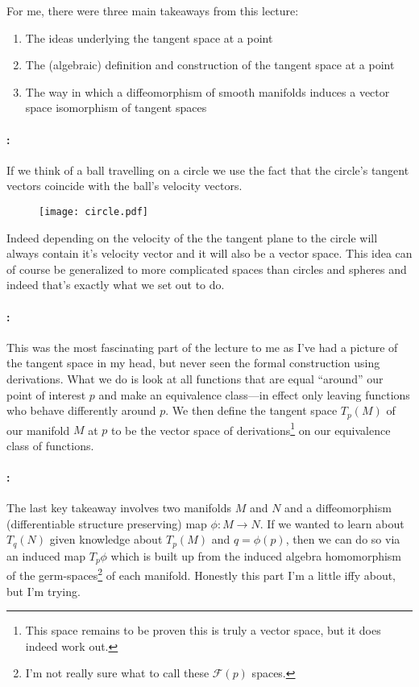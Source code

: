 \documentclass{homework}
\begin{document}
For me, there were three main takeaways from this lecture:
\begin{enumerate}
	\item The ideas underlying the tangent space at a point \label{it:idea}
	\item The (algebraic) definition and construction of the tangent space at a point \label{it:alg}
	\item The way in which a diffeomorphism of smooth manifolds induces a vector space isomorphism of tangent spaces \label{it:diff}
\end{enumerate}

\paragraph{:}
If we think of a ball travelling on a circle we use the fact that the circle's tangent vectors coincide with the ball's velocity vectors.
\begin{figure}[h]
	\centering
	\texttt{[image: circle.pdf]}
\end{figure}
Indeed depending on the velocity of the the tangent plane to the circle will always contain it's velocity vector and it will also be a vector space.
This idea can of course be generalized to more complicated spaces than circles and spheres and indeed that's exactly what we set out to do.

\paragraph{:}
This was the most fascinating part of the lecture to me as I've had a picture of the tangent space in my head, but never seen the formal construction using derivations.
What we do is look at all functions that are equal ``around'' our point of interest $p$ and make an equivalence class---in effect only leaving functions who behave differently around $p$.
We then define the tangent space $T_p(M)$ of our manifold $M$ at $p$ to be the vector space of derivations\footnote{This space remains to be proven this is truly a vector space, but it does indeed work out.} on our equivalence class of functions.

\paragraph{:}
The last key takeaway involves two manifolds $M$ and $N$ and a diffeomorphism (differentiable structure preserving) map $\phi: M \to N$.
If we wanted to learn about $T_q(N)$ given knowledge about $T_p(M)$ and $q = \phi(p)$, then we can do so via an induced map $T_p\phi$ which is built up from the induced algebra homomorphism of the germ-spaces\footnote{I'm not really sure what to call these $\mathcal{F}(p)$ spaces.} of each manifold.
Honestly this part I'm a little iffy about, but I'm trying.
\end{document}
